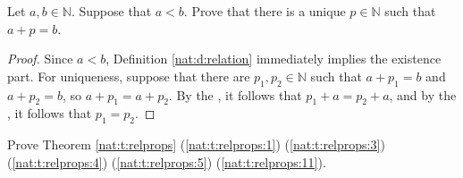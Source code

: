 \Newpage
\begin{exercise} %
	Let $a, b \in \mathbb{N}$. Suppose that $a < b$. Prove that there is a unique $p \in \mathbb{N}$ such that $a + p = b$.
\end{exercise}

\begin{proof}
	Since $a < b$, Definition \ref{nat:d:relation} immediately implies the existence part. For uniqueness, suppose that there are $p_{1}, p_{2} \in \mathbb{N}$ such that $a + p_{1} = b$ and $a + p_{2} = b$, so $a + p_{1} = a + p_{2}$. By the , it follows that $p_{1} + a = p_{2} + a$, and by the , it follows that $p_{1} = p_{2}$.
\end{proof}


\Newpage
\begin{exercise} %
	Prove Theorem \ref{nat:t:relprops} (\ref{nat:t:relprops:1}) (\ref{nat:t:relprops:3}) (\ref{nat:t:relprops:4}) (\ref{nat:t:relprops:5}) (\ref{nat:t:relprops:11}).
\end{exercise}

